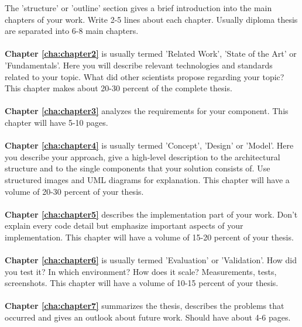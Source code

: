 The 'structure' or 'outline' section gives a brief introduction into the main chapters of
your work. Write 2-5 lines about each chapter. Usually diploma thesis are separated into
6-8 main chapters.\\
\\
\textbf{Chapter \ref{cha:chapter2}} is usually termed 'Related Work', 'State of the Art'
or 'Fundamentals'. Here you will describe relevant technologies and standards related
to your topic. What did other scientists propose regarding your topic? This chapter makes
about 20-30 percent of the complete thesis.\\
\\
\textbf{Chapter \ref{cha:chapter3}} analyzes the requirements for your component. This
chapter will have 5-10 pages.\\
\\
\textbf{Chapter \ref{cha:chapter4}} is usually termed 'Concept', 'Design' or 'Model'.
Here you describe your approach, give a high-level description to the architectural
structure and to the single components that your solution consists of. Use structured
images and UML diagrams for explanation. This chapter will have a volume of 20-30
percent of your thesis.\\
\\
\textbf{Chapter \ref{cha:chapter5}} describes the implementation part of your work. Don't
explain every code detail but emphasize important aspects of your implementation. This
chapter will have a volume of 15-20 percent of your thesis.\\
\\
\textbf{Chapter \ref{cha:chapter6}} is usually termed 'Evaluation' or 'Validation'. How
did you test it? In which environment? How does it scale? Measurements, tests, screenshots.
This chapter will have a volume of 10-15 percent of your thesis.\\
\\
\textbf{Chapter \ref{cha:chapter7}} summarizes the thesis, describes the problems that
occurred and gives an outlook about future work. Should have about 4-6 pages.
